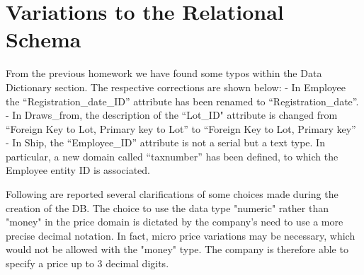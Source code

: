 \section{Variations to the Relational Schema}

From the previous homework we have found some typos within the Data Dictionary section. The respective corrections are shown below:
- In Employee the ``Registration\_date\_ID'' attribute has been renamed to ``Registration\_date''.
- In Draws\_from, the description of the ``Lot\_ID" attribute is changed from ``Foreign Key to Lot, Primary key to Lot'' to ``Foreign Key to Lot, Primary key''
- In Ship, the ``Employee\_ID'' attribute is not a serial but a text type. In particular, a new domain called ``taxnumber'' has been defined, to which the Employee entity ID is associated.

Following are reported several clarifications of some choices made during the creation of the DB. The choice to use the data type "numeric" rather than "money" in the price domain is dictated by the company's need to use a more precise decimal notation. In fact, micro price variations may be necessary, which would not be allowed with the "money" type. The company is therefore able to specify a price up to 3 decimal digits.